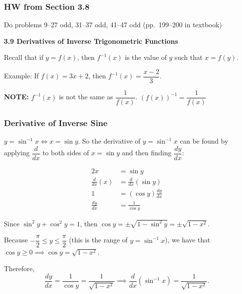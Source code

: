\documentclass[14pt]{beamer}
\begin{document}
\begin{frame}
\frametitle{HW from Section 3.8}
Do problems 9--27 odd, 31--37 odd, 41--47 odd (pp.\ 199--200 in textbook)
\end{frame}



\begin{frame}

\begin{center}
\large{{\bf 3.9 Derivatives of Inverse Trigonometric Functions}}
\end{center}

\bigskip

\hrulefill

\bigskip

Recall that if $y=f(x)$, then $f^{-1}(x)$ is the value of $y$ such that $x=f(y)$.

\bigskip

Example:  If $f(x)=3x+2$, then $f^{-1}(x)=\dfrac{x-2}{3}.$

\bigskip

{\bf NOTE:}  $f^{-1}(x)$ is not the same as $\dfrac{1}{f(x)}$.  $(f(x))^{-1}=\dfrac{1}{f(x)}$


\end{frame}

\begin{frame}

\frametitle{Derivative of Inverse Sine}

$y=\sin^{-1}x \Longleftrightarrow x=\sin y$.  So the derivative of $y=\sin^{-1}x$ can be found by applying $\dfrac{d}{dx}$ to both sides of $x=\sin y$ and then finding 
$\dfrac{dy}{dx}$:

\begin{alignat*}{2}
x &= \sin y \\
\frac{d}{dx}(x) &= \frac{d}{dx}(\sin y) \\
1 &= (\cos y) \frac{dy}{dx} \\
\frac{dy}{dx} &= \frac{1}{\cos y}
\end{alignat*}

\end{frame}

\begin{frame}

Since $\sin^2 y + \cos^2 y = 1$, then $\cos y= \pm \sqrt{1-\sin^2 y}=\pm\sqrt{1-x^2}.$

\bigskip

Because $-\dfrac{\pi}{2} \le y \le \dfrac{\pi}{2}$ (this is the range of $y=\sin^{-1}x$), we have that $\cos y \ge 0 \implies \cos y = \sqrt{1-x^2}$.

\bigskip

Therefore,
$$\frac{dy}{dx}=\frac{1}{\cos y}=\frac{1}{\sqrt{1-x^2}} \implies \frac{d}{dx}(\sin^{-1}x)=\frac{1}{\sqrt{1-x^2}}.$$ 

\end{frame}
\end{document}
